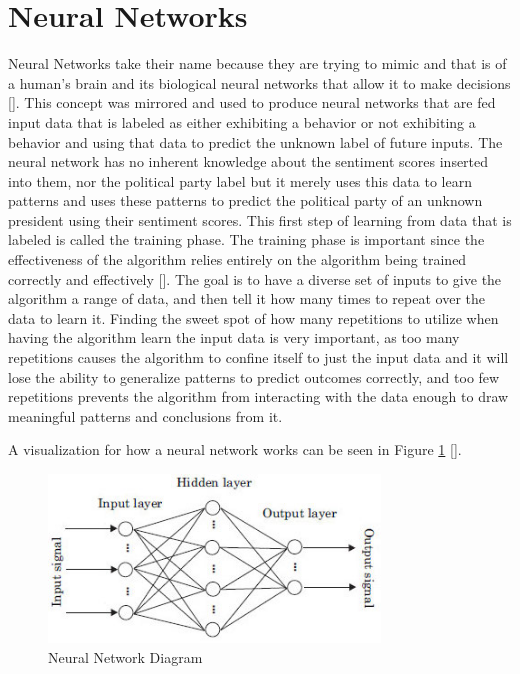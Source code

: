 \section{Neural Networks}
Neural Networks take their name because they are trying to mimic and that is of a human's brain and its biological neural networks that allow it to make decisions [\cite{hansen1990neural}].
This concept was mirrored and used to produce neural networks that are fed input data that is labeled as either exhibiting a behavior or not exhibiting a behavior and using that data to predict the unknown label of future inputs.
The neural network has no inherent knowledge about the sentiment scores inserted into them, nor the political party label but it merely uses this data to learn patterns and uses these patterns to predict the political party of an unknown president using their sentiment scores.
This first step of learning from data that is labeled is called the training phase.
The training phase is important since the effectiveness of the algorithm relies entirely on the algorithm being trained correctly and effectively [\cite{hepner1990artificial}].
The goal is to have a diverse set of inputs to give the algorithm a range of data, and then tell it how many times to repeat over the data to learn it.
Finding the sweet spot of how many repetitions to utilize when having the algorithm learn the input data is very important, as too many repetitions causes the algorithm to confine itself to just the input data and it will lose the ability to generalize patterns to predict outcomes correctly, and too few repetitions prevents the algorithm from interacting with the data enough to draw meaningful patterns and conclusions from it.

A visualization for how a neural network works can be seen in Figure \ref{fig:nndiagram} [\cite{juan2013nndiagram}].


\begin{figure}
\begin{center}
  \includegraphics[width=250pt]{images/nndiagram.jpg}
  \caption{Neural Network Diagram}
  \label{fig:nndiagram}
  \end{center}
\end{figure}




